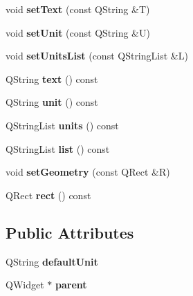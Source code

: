 \begin{DoxyCompactItemize}
void {\bfseries set\+Text} (const Q\+String \&T)
\item 
\mbox{\label{class_unit_text_box2_a15e72f493402340054f22b9d6eed7227}} 
void {\bfseries set\+Unit} (const Q\+String \&U)
\item 
\mbox{\label{class_unit_text_box2_ad1b3f7e52f2f7b17ad21cfabc264f1c0}} 
void {\bfseries set\+Units\+List} (const Q\+String\+List \&L)
\item 
\mbox{\label{class_unit_text_box2_a241d76afbcf77ef14e9d582c6b0c3dad}} 
Q\+String {\bfseries text} () const
\item 
\mbox{\label{class_unit_text_box2_a632b77a0972ed46f77510995c8ad2f37}} 
Q\+String {\bfseries unit} () const
\item 
\mbox{\label{class_unit_text_box2_aa0c1c1aa4892b3c64d99c44e50ef9fd8}} 
Q\+String\+List {\bfseries units} () const
\item 
\mbox{\label{class_unit_text_box2_afbcf1ea38ea4e1901b0416df25c8cede}} 
Q\+String\+List {\bfseries list} () const
\item 
\mbox{\label{class_unit_text_box2_a8d298acfb26275fe4a981e508cbe4017}} 
void {\bfseries set\+Geometry} (const Q\+Rect \&R)
\item 
\mbox{\label{class_unit_text_box2_a61229e40ac144f12fa93f4deb90a3895}} 
Q\+Rect {\bfseries rect} () const
\end{DoxyCompactItemize}
\subsection*{Public Attributes}
\begin{DoxyCompactItemize}
\item 
\mbox{\label{class_unit_text_box2_a2c4f40abf6deb37272473854d8c1bad0}} 
Q\+String {\bfseries default\+Unit}
\item 
\mbox{\label{class_unit_text_box2_a2587c9c384debb21b393ed1823c8440e}} 
Q\+Widget $\ast$ {\bfseries parent}
\end{DoxyCompactItemize}
